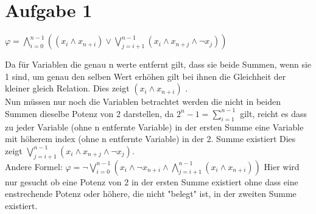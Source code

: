 \section*{Aufgabe 1}


$\varphi = \bigwedge_{i=0}^{n-1}((x_i \wedge x_{n+i}) \vee \bigvee_{j=i+1}^{n-1}( x_i \wedge x_{n+j} \wedge \neg x_{j}))$ 



Da für Variablen die genau n werte entfernt gilt, dass sie beide Summen, wenn sie 1 sind, um genau den selben Wert erhöhen gilt bei ihnen die Gleichheit der kleiner gleich Relation. Dies zeigt $(x_i \wedge x_{n+i})$ .\\


Nun müssen nur noch die Variablen betrachtet werden die nicht in beiden Summen dieselbe Potenz von 2 darstellen, da $2^n-1 = \sum_{i=1}^{n-1}$ gilt, reicht es dass zu jeder Variable (ohne n entfernte Variable) in der ersten Summe eine Variable mit höherem index (ohne n entfernte Variable) in der 2. Summe  existiert
Dies zeigt $ \bigvee_{j=i+1}^{n-1}( x_i \wedge x_{n+j} \wedge \neg x_{j})$. \\



Andere Formel: $ \varphi = \neg \bigvee_{i=0}^{n-1}(x_i \wedge \neg x_{n+i} \wedge \bigwedge_{j=i+1}^{n-1} (x_i \wedge x_{n+i}))$ 
Hier wird nur gesucht ob eine Potenz von 2 in der ersten Summe existiert ohne dass eine enstrechende Potenz oder höhere, die nicht "belegt" ist, in der zweiten Summe existiert.